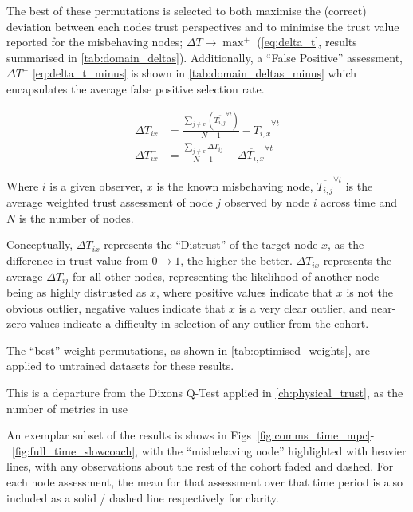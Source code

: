 The best of these permutations is selected to both maximise the (correct) deviation between each nodes trust perspectives and to minimise the trust value reported for the misbehaving nodes; $\Delta T \to \max^+$ (\autoref{eq:delta_t}, results summarised in \autoref{tab:domain_deltas}).
Additionally, a ``False Positive'' assessment, $\Delta T^-$ \autoref{eq:delta_t_minus} is shown in \autoref{tab:domain_deltas_minus} which encapsulates the average false positive selection rate.

\begin{align}
  \Delta T_{ix} &= \frac{\sum_{j\neq x}\left( \overline{T_{i,j}}^{\forall t}\right)}{N-1} - \overline{T_{i,x}}^{\forall t} \label{eq:delta_t}\\
  \Delta T_{ix}^- &= \frac{\sum_{j\neq x} \Delta T_{ij}}{N-1} - \overline{\Delta T_{i,x}}^{\forall t} \label{eq:delta_t_minus} 
\end{align}

Where $i$ is a given observer, $x$ is the known misbehaving node, $\overline{T_{i,j}}^{\forall t}$ is the average weighted trust assessment of node $j$ observed by node $i$ across time and $N$ is the number of nodes.

Conceptually, $\Delta T_{ix}$ represents the ``Distrust'' of the target node $x$, as the difference in trust value from $0\to1$, the higher the better. 
$\Delta T_{ix}^-$ represents the average $\Delta T_{ij}$ for all other nodes, representing the likelihood of another node being as highly distrusted as $x$, where positive values indicate that $x$ is not the obvious outlier, negative values indicate that $x$ is a very clear outlier, and near-zero values indicate a difficulty in selection of any outlier from the cohort.

The ``best'' weight permutations, as shown in \autoref{tab:optimised_weights}, are applied to untrained datasets for these results.

This is a departure from the Dixons Q-Test applied in \autoref{ch:physical_trust}, as the number of metrics in use 

An exemplar subset of the results is shows in Figs~\ref{fig:comms_time_mpc}-~\ref{fig:full_time_slowcoach}, with the ``misbehaving node'' highlighted with heavier lines, with any observations about the rest of the cohort faded and dashed. For each node assessment, the mean for that assessment over that time period is also included as a solid / dashed line respectively for clarity.

